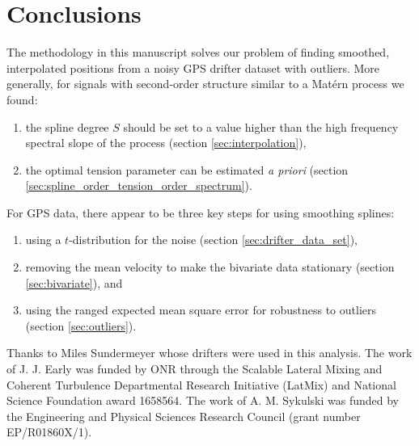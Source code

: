 \documentclass{ametsoc}
\begin{document}
\section{Conclusions}

The methodology in this manuscript solves our problem of finding smoothed, interpolated positions from a noisy GPS drifter dataset with outliers. More generally, for signals with second-order structure similar to a Mat\'ern process we found:
\begin{enumerate}
\item the spline degree $S$ should be set to a value higher than the high frequency spectral slope of the process (section \ref{sec:interpolation}),
\item the optimal tension parameter can be estimated \emph{a priori} (section \ref{sec:spline_order_tension_order_spectrum}).
\end{enumerate}
For GPS data, there appear to be three key steps for using smoothing splines:
\begin{enumerate}
    \item using a $t$-distribution for the noise (section \ref{sec:drifter_data_set}),
    \item removing the mean velocity to make the bivariate data stationary (section \ref{sec:bivariate}), and
    \item using the ranged expected mean square error for robustness to outliers (section \ref{sec:outliers}).
\end{enumerate}

\acknowledgments
Thanks to Miles Sundermeyer whose drifters were used in this analysis. The work of J. J. Early was funded by ONR through the Scalable Lateral Mixing and Coherent Turbulence Departmental Research Initiative (LatMix) and National Science Foundation award 1658564. The work of A. M. Sykulski was funded by the Engineering and Physical Sciences Research Council (grant number EP/R01860X/1).

%
\appendix[A]
%
\end{document}
